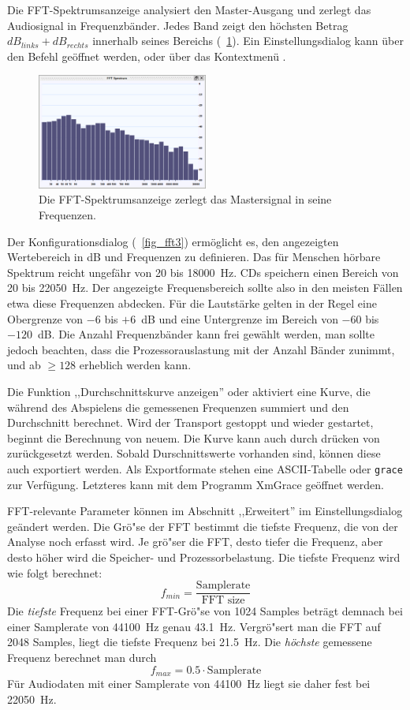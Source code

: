 Die FFT-Spektrumsanzeige analysiert den Master-Ausgang und zerlegt das Audiosignal in Frequenzbänder. Jedes Band zeigt den höchsten Betrag $dB_{links} + dB_{rechts}$ innerhalb seines Bereichs (\FigB\ \ref{fig_fft1}). Ein Einstellungsdialog kann über den Befehl  geöffnet werden, oder über das Kontextmenü .

\begin{figure}
	\centering
	\includegraphics[width=0.5\textwidth]{../images/fft1}
	\caption{Die FFT-Spektrumsanzeige zerlegt das Mastersignal in seine Frequenzen.}
	\label{fig_fft1}
\end{figure}

Der Konfigurationsdialog (\FigB\ \ref{fig_fft3}) ermöglicht es, den angezeigten Wertebereich in dB und Frequenzen zu definieren. Das für Menschen hörbare Spektrum reicht ungefähr von 20 bis 18000~Hz. CDs speichern einen Bereich von 20 bis 22050~Hz. Der angezeigte Frequensbereich sollte also in den meisten Fällen etwa diese Frequenzen abdecken. Für die Lautstärke gelten in der Regel eine Obergrenze von $-6$ bis $+6$~dB und eine Untergrenze im Bereich von $-60$ bis $-120$~dB. Die Anzahl Frequenzbänder kann frei gewählt werden, man sollte jedoch beachten, dass die Prozessorauslastung mit der Anzahl Bänder zunimmt, und ab $\geq 128$ erheblich werden kann.

Die Funktion ,,Durchschnittskurve anzeigen'' oder  aktiviert eine Kurve, die während des Abspielens die gemessenen Frequenzen summiert und den Durchschnitt berechnet. Wird der Transport gestoppt und wieder gestartet, beginnt die Berechnung von neuem. Die Kurve kann auch durch drücken von  zurückgesetzt werden. Sobald Durschnittswerte vorhanden sind, können diese auch exportiert werden. Als Exportformate stehen eine ASCII-Tabelle oder \texttt{grace} zur Verfügung. Letzteres kann mit dem Programm XmGrace geöffnet werden.

FFT-relevante Parameter können im Abschnitt ,,Erweitert'' im Einstellungsdialog geändert werden. Die Grö"se der FFT bestimmt die tiefste Frequenz, die von der Analyse noch erfasst wird. Je grö"ser die FFT, desto tiefer die Frequenz, aber desto höher wird die Speicher- und Prozessorbelastung. Die tiefste Frequenz wird wie folgt berechnet:
\[
f_{min} = \frac{\textrm{Samplerate}}{\textrm{FFT size}}
\]
Die \emph{tiefste} Frequenz bei einer FFT-Grö"se von 1024 Samples beträgt demnach bei einer Samplerate von 44100~Hz genau 43.1~Hz. Vergrö"sert man die FFT auf 2048 Samples, liegt die tiefste Frequenz bei 21.5~Hz. Die \emph{höchste} gemessene Frequenz berechnet man durch
\[
f_{max} = 0.5 \cdot \textrm{Samplerate}
\]
Für Audiodaten mit einer Samplerate von 44100~Hz liegt sie daher fest bei 22050~Hz.


